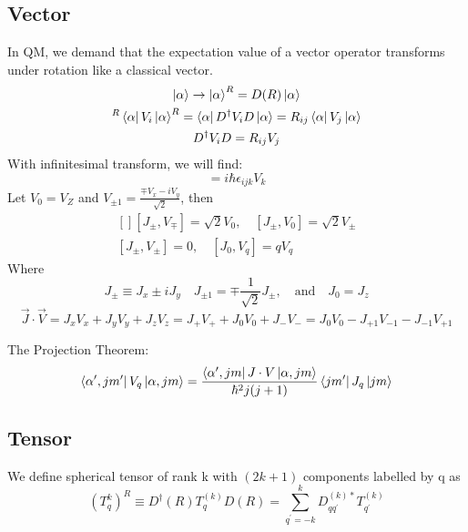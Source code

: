 \subsection{Vector}
In QM, we demand that the expectation value of a vector operator transforms
under rotation like a classical vector.
\begin{gather*}
    \ket{\alpha}\rightarrow\ket{\alpha}^R=D(R)\ket{\alpha}\\
    ^{R}\bra{\alpha}V_i\ket{\alpha}^R=\bra{\alpha}D^{\dag}V_{i}D\ket{\alpha}=R_{ij}\bra{\alpha}V_j\ket{\alpha}\\
    D^{\dag}V_{i}D=R_{ij}V_j
\end{gather*}
With infinitesimal transform, we will find:
\begin{equation}
    [J_i,V_j]=i\hbar\epsilon_{ijk}V_k
\end{equation}
Let $V_0 = V_Z$ and $V_{\pm 1} = \frac{\mp V_x -iV_y}{\sqrt{2}}$, 
then
\[
    \begin{aligned}[]
	[J_\pm, V_\mp] = \sqrt{2}V_0 , \quad [J_\pm, V_0] = \sqrt{2}V_\pm \\
	[J_\pm, V_\pm] = 0, \quad [J_0, V_q] = qV_q
    \end{aligned}
\]
Where
\begin{equation}
    J_\pm \equiv J_x \pm iJ_y	\quad J_{\pm 1} = \mp \frac{1}{\sqrt{2}}J_\pm, \quad \text{and} \quad J_0 = J_z
\end{equation}
\begin{equation}
    \vec{J}\cdot\vec{V} = J_xV_x + J_yV_y + J_zV_z = J_+V_+ + J_0V_0 + J_-V_- = J_0V_0 - J_{+1}V_{-1} - J_{-1}V_{+1}
\end{equation}

The Projection Theorem:
\begin{equation}
    \bra{\alpha',jm'}V_q\ket{\alpha,jm} = \frac{\bra{\alpha',jm}J\cdot V\ket{\alpha,jm}}{\hbar^2j(j+1)}\bra{jm'}J_q\ket{jm}
\end{equation}



\subsection{Tensor}
We define spherical tensor of rank k with $(2k+1)$ components labelled by q
as
\begin{equation}
    (T^k_q)^R \equiv D^{\dag}(R)T^{(k)}_{q}D(R)=\displaystyle\sum_{q^\prime=-k}^{k}D^{(k)*}_{qq^\prime}T^{(k)}_{q^\prime}
\end{equation}

